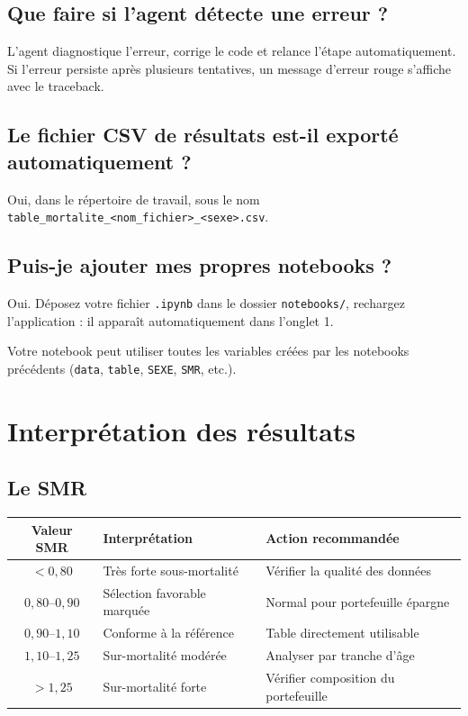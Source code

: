 \documentclass[11pt,a4paper]{article}
\begin{document}
\subsection{Que faire si l'agent détecte une erreur ?}
L'agent diagnostique l'erreur, corrige le code et relance l'étape automatiquement.
Si l'erreur persiste après plusieurs tentatives, un message d'erreur rouge s'affiche
avec le traceback.

\subsection{Le fichier CSV de résultats est-il exporté automatiquement ?}
Oui, dans le répertoire de travail, sous le nom
\texttt{table\_mortalite\_<nom\_fichier>\_<sexe>.csv}.

\subsection{Puis-je ajouter mes propres notebooks ?}
Oui. Déposez votre fichier \texttt{.ipynb} dans le dossier \texttt{notebooks/},
rechargez l'application : il apparaît automatiquement dans l'onglet 1.

\begin{infobox}
Votre notebook peut utiliser toutes les variables créées par les notebooks précédents
(\texttt{data}, \texttt{table}, \texttt{SEXE}, \texttt{SMR}, etc.).
\end{infobox}

\section{Interprétation des résultats}

\subsection{Le SMR}

\begin{center}
\begin{tabular}{cll}
\toprule
\textbf{Valeur SMR} & \textbf{Interprétation} & \textbf{Action recommandée} \\
\midrule
$< 0{,}80$ & Très forte sous-mortalité & Vérifier la qualité des données \\
$0{,}80$–$0{,}90$ & Sélection favorable marquée & Normal pour portefeuille épargne \\
$0{,}90$–$1{,}10$ & Conforme à la référence & Table directement utilisable \\
$1{,}10$–$1{,}25$ & Sur-mortalité modérée & Analyser par tranche d'âge \\
$> 1{,}25$ & Sur-mortalité forte & Vérifier composition du portefeuille \\
\bottomrule
\end{tabular}
\end{center}
\end{document}
